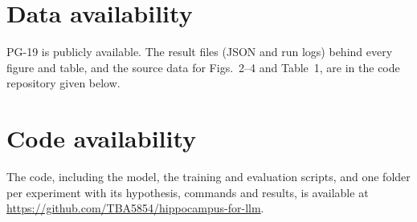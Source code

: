\section*{Data availability}
PG-19 is publicly available\cite{rae2020compressive}. The result files (JSON and run logs) behind
every figure and table, and the source data for Figs.~2--4 and Table~1, are in the code
repository given below.

\section*{Code availability}
The code, including the model, the training and evaluation scripts, and one folder per
experiment with its hypothesis, commands and results, is available at
\url{https://github.com/TBA5854/hippocampus-for-llm}.
